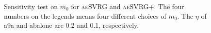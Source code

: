 \documentclass[conference]{IEEEtran}
\begin{document}
 \begin{figure}[ht]
 \label{aeSVRG_aeSVRG+}
\centering
{}
\caption{Sensitivity test on $m_0$ for \textsc{aeSVRG} and \textsc{aeSVRG+}. The four numbers on the legends means four different choices of $m_0$. The $\eta$ of a9a and abalone are 0.2 and 0.1, respectively.}

\end{figure}
\end{document}

